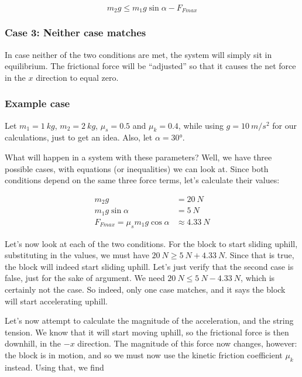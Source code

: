 \begin{equation}
m_2 g \le m_1 g \sin \alpha - F_{Fmax}
\end{equation}

\subsubsection{Case 3: Neither case matches}

In case neither of the two conditions are met, the system will simply sit in equilibrium. The frictional force will be ``adjusted'' so that it causes the net force in the $x$ direction to equal zero.

\subsubsection{Example case}

Let $m_1 = \SI{1}{kg}$, $m_2 = \SI{2}{kg}$, $\mu_s = 0.5$ and $\mu_k = 0.4$, while using $g = \SI{10}{m/s^2}$ for our calculations, just to get an idea. Also, let $\alpha = \ang{30}$.

What will happen in a system with these parameters? Well, we have three possible cases, with equations (or inequalities) we can look at. Since both conditions depend on the same three force terms, let's calculate their values:

\begin{align}
m_2 g &= \SI{20}{N}\\
m_1 g \sin \alpha &= \SI{5}{N}\\
F_{Fmax} = \mu_s m_1 g \cos \alpha &\approx \SI{4.33}{N}
\end{align}

Let's now look at each of the two conditions. For the block to start sliding uphill, substituting in the values, we must have $\SI{20}{N} \ge \SI{5}{N} + \SI{4.33}{N}$. Since that is true, the block will indeed start sliding uphill. Let's just verify that the second case is false, just for the sake of argument. We need $\SI{20}{N} \le \SI{5}{N} - \SI{4.33}{N}$, which is certainly not the case. So indeed, only one case matches, and it says the block will start accelerating uphill.

Let's now attempt to calculate the magnitude of the acceleration, and the string tension. We know that it will start moving uphill, so the frictional force is then downhill, in the $-x$ direction. The magnitude of this force now changes, however: the block is in motion, and so we must now use the kinetic friction coefficient $\mu_k$ instead. Using that, we find

